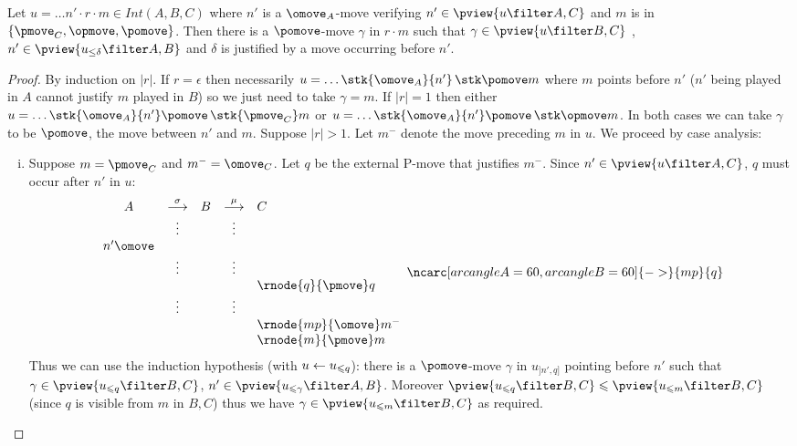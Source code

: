 \begin{lemma}
\label{lem:middlepomove}
Let $u = \ldots n' \cdot r \cdot m \in Int(A,B,C)$ where
$n'$ is a $\omove_A$-move verifying $n' \in \pview{u\filter A,C}$ and $m$ is in $\{ \pmove_C, \opmove, \pomove \}$. Then there is a $\pomove$-move $\gamma$ in $r \cdot m$ such that $\gamma \in \pview{u\filter B,C}$ , $n' \in \pview{u_{\leq \delta} \filter A,B}$ and $\delta$ is justified by a move occurring before $n'$.
\end{lemma}
\begin{proof}
By induction on $|r|$.
If $r=\epsilon$ then necessarily $u = \ldots \stk{\omove_A}{n'} \thinspace\stk \pomove m$ where $m$ points before $n'$ ($n'$ being played in $A$ cannot justify $m$ played in $B$) so we just need to take $\gamma = m$.
If $|r|=1$ then either 
$u = \ldots \stk{\omove_A}{n'} \pomove\thinspace\stk {\pmove_C} m$
or $u = \ldots \stk{\omove_A}{n'} \pomove\thinspace\stk \opmove m$.
In both cases we can take $\gamma$ to be $\pomove$, the move between $n'$ and $m$.
Suppose $|r|>1$. Let $m^-$ denote the move preceding $m$ in $u$.
We proceed by case analysis:
\begin{enumerate}[i.]
\item Suppose $m = \pmove_C$ and $m^- = \omove_C$.
Let $q$ be the external P-move that justifies $m^-$.
Since $n' \in \pview{u\filter A,C}$, $q$ must occur after $n'$ in $u$:
$$ 
\begin{array}{ccccl}
A & \stackrel\sigma{\longrightarrow} & B & \stackrel\mu{\longrightarrow} & C \\
&\vdots&&\vdots\\
n' \omove\\
&\vdots&&\vdots  \\
&& & &  \rnode{q}{\pmove}q  \\
&\vdots&&\vdots  \\
&& & &  \rnode{mp}{\omove}m^-  \\
&& & &  \rnode{m}{\pmove}m  \\
\end{array}
\ncarc[arcangleA=60,arcangleB=60]{->}{mp}{q}
 $$  
Thus we can use the induction hypothesis (with $u\leftarrow u_{\leqslant q}$): there is a $\pomove$-move $\gamma$ 
in $u_{]n',q]}$ pointing before $n'$ such that $\gamma \in \pview{u_{\prefixof q} \filter B,C}$, $n' \in \pview{u_{\prefixof \gamma} \filter A,B}$.
Moreover $\pview{u_{\prefixof q} \filter B,C} \prefixof \pview{u_{\prefixof m} \filter B,C}$ (since $q$ is visible from $m$ in $B,C$) thus we have $\gamma \in \pview{u_{\prefixof m} \filter B,C}$ as required.


\end{enumerate}
\end{proof}
